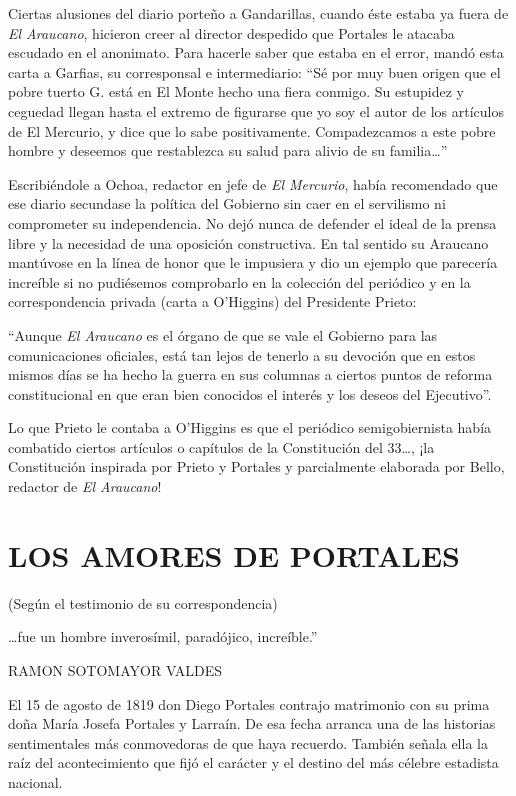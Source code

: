 \documentclass[10pt,twoside,openright]{memoir}
\begin{document}
Ciertas alusiones del diario porteño a Gandarillas, cuando éste estaba
ya fuera de \emph{El Araucano}, hicieron creer al director despedido que
Portales le atacaba escudado en el anonimato. Para hacerle saber que
estaba en el error, mandó esta carta a Garfias, su corresponsal e
intermediario: ``Sé por muy buen origen que el pobre tuerto G. está en El
Monte hecho una fiera conmigo. Su estupidez y ceguedad llegan hasta
el extremo de figurarse que yo soy
el autor de los artículos de El Mercurio, y dice que lo sabe
positivamente. Compadezcamos a este pobre hombre y deseemos que
restablezca su salud para alivio de su familia\ldots''

Escribiéndole a Ochoa, redactor en jefe de \emph{El Mercurio}, había
recomendado que ese diario secundase la política del Gobierno sin caer
en el servilismo ni comprometer su independencia. No dejó nunca de
defender el ideal de la prensa libre y la necesidad de una oposición
constructiva. En tal sentido su Araucano mantúvose en la línea de honor
que le impusiera y dio un ejemplo que parecería increíble si no
pudiésemos comprobarlo en la colección del periódico y en la
correspondencia privada (carta a O'Higgins) del Presidente Prieto:

``Aunque \emph{El Araucano} es el órgano de que se vale el Gobierno para las
comunicaciones oficiales, está tan lejos de tenerlo a su devoción que
en estos mismos días se ha hecho la guerra en sus columnas a ciertos
puntos de reforma constitucional en que eran bien conocidos el interés y
los deseos del Ejecutivo''.

Lo que Prieto le contaba a O'Higgins es que el periódico semigobiernista
había combatido ciertos artículos o capítulos de la Constitución del
33\ldots, ¡la Constitución inspirada por Prieto y Portales y parcialmente
elaborada por Bello, redactor de \emph{El Araucano}!

\chapter{LOS AMORES DE PORTALES}{(Según el testimonio de su correspondencia)}

\epigraph{\ldots{}fue un hombre inverosímil, paradójico, increíble.''}{RAMON SOTOMAYOR VALDES}

El 15 de agosto de 1819 don Diego Portales contrajo matrimonio con su
prima doña María Josefa Portales y Larraín. De esa fecha arranca una de
las historias sentimentales más
conmovedoras de que haya recuerdo. También señala ella la raíz del
acontecimiento que fijó el carácter y el destino del más célebre
estadista nacional.
\end{document}
